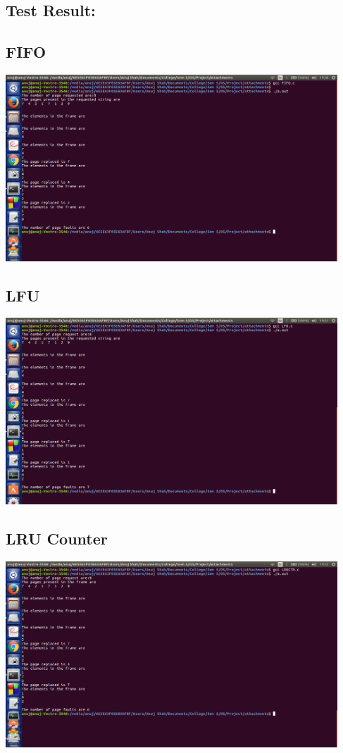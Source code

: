 \documentclass[12pt]{article}
\begin{document}
		\begin{flushleft}
			\section{Test Result:}
		
		\subsection{FIFO}
		\includegraphics[height=7cm]{FIFO_result.png}
    	\subsection{LFU}
		\includegraphics[height=7cm]{LFU_result.png}
		\subsection{LRU Counter}
		\includegraphics[height=7cm]{LRUCTR_result.png}

\end{flushleft}
\end{document}

